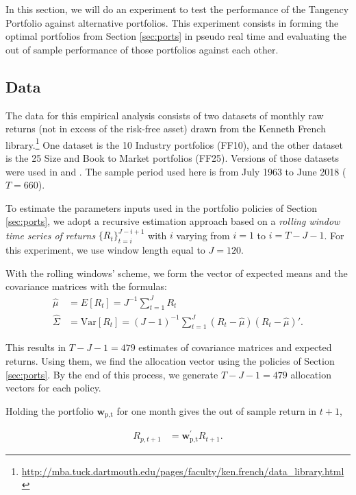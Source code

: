 \documentclass[12pt,oneside,a4paper]{memoir}
\begin{document}
\noindent In this section, we will do an experiment to test the performance of the Tangency Portfolio against alternative portfolios. This experiment consists in forming the optimal portfolios from Section \ref{sec:ports} in pseudo real time and evaluating the out of sample performance of those portfolios against each other.

\subsection{Data}
The data for this empirical analysis consists of two datasets of monthly raw returns (not in excess of the risk-free asset) drawn from the Kenneth French library.\footnote[1]{\url{http://mba.tuck.dartmouth.edu/pages/faculty/ken.french/data_library.html}} One dataset is the 10 Industry portfolios (FF10), and the other dataset is the 25 Size and Book to Market portfolios (FF25). Versions of those datasets were used in  and . The sample period used here is from July 1963 to June 2018 ($T=660$).

To estimate the parameters inputs used in the portfolio policies of Section \ref{sec:ports}, we adopt a recursive estimation approach based on a \textit{rolling window time series of returns} $\{R_{t}\}_{t=i}^{J-i+1}$  with $i$ varying from $i=1$ to $i=T-J-1$. For this experiment, we use window length equal to $J=120$.

With the rolling windows' scheme, we form the vector of expected means and the covariance matrices with the formulas:
% 
\begin{align}
	\hat{\mu} &= E[R_{t}] = J^{-1}\sum_{t=1}^{J} R_{t} 
	\\
	\hat{\Sigma} &= \mathrm{Var}[R_{t}] = (J-1)^{-1} \sum_{t=1}^{J}(R_{t} - \hat{\mu})(R_{t} - \hat{\mu})'.
\end{align}
 
This results in $T-J-1=479$ estimates of covariance matrices and expected returns. Using them, we find the allocation vector using the policies of Section \ref{sec:ports}. By the end of this process, we generate $T-J-1=479$ allocation vectors for each policy. 

Holding the portfolio $\mathbf{w}_{\textrm{p,t}}$ for one month gives the out of sample return in $t+1$,

\vspace{-1 em}
\begin{align}
	R_{p,t+1} &= \mathbf{w}_{\textrm{p,t}}^{\prime}  R_{t+1}.
\end{align}
\end{document}
